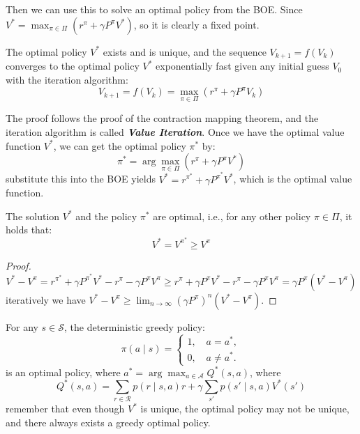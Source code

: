 \documentclass[10pt]{elegantbook}
\newcommand{\mydefination}[1]{\textbf{\textit{\textcolor{structurecolor}{#1}}}}
\begin{document}
Then we can use this to solve an optimal policy from the BOE. Since $V^* = \max_{\pi \in \Pi} (r^{\pi} + \gamma P^{\pi}V^*)$, so it is clearly a 
fixed point.

\begin{theorem}
    The optimal policy $V^*$ exists and is unique, and the sequence $V_{k+1} = f(V_k)$ converges to the optimal policy $V^*$ exponentially fast
    given any initial guess $V_0$ with the iteration algorithm:
    \[ V_{k+1} = f(V_k) = \max_{\pi \in \Pi} (r^{\pi} + \gamma P^{\pi}V_k) \]
\end{theorem}

The proof follows the proof of the contraction mapping theorem, and the iteration algorithm is called \mydefination{Value Iteration}.
Once we have the optimal value function $V^*$, we can get the optimal policy $\pi^*$ by:
\begin{equation}
    \pi^* = \arg\max_{\pi \in \Pi} (r^{\pi} + \gamma P^{\pi}V^*)
\end{equation}
substitute this into the BOE yields $V^* = r^{\pi^*} + \gamma P^{\pi^*}V^*$, which is the optimal value function.

\begin{theorem}
    The solution $V^*$ and the policy $\pi^*$ are optimal, i.e., for any other policy $\pi \in \Pi$, it holds that:
    \[ V^* = V^{\pi^*} \geq V^{\pi} \] 
\end{theorem}

\begin{proof}
    \[ V^* - V^{\pi} = r^{\pi^*} + \gamma P^{\pi^*}V^* - r^{\pi} - \gamma P^{\pi}V^{\pi} \geq 
    r^{\pi} + \gamma P^{\pi}V^* - r^{\pi} - \gamma P^{\pi}V^{\pi} = \gamma P^{\pi} (V^* - V^{\pi}) \]
    iteratively we have $V^* - V^{\pi} \geq \lim_{n \rightarrow \infty} (\gamma P^{\pi})^n (V^* - V^{\pi})$.
\end{proof}

\begin{theorem}
    For any $s \in \mathcal S$, the deterministic greedy policy:
    \begin{equation} \label{eq:greedy_policy}
        \pi(a \mid s) = \left \{ 
        \begin{array}{l}
            1, \quad a = a^*, \\
            0, \quad a \neq a^*.
        \end{array} \right .
    \end{equation}
    is an optimal policy, where $a^* = \arg\max_{a \in \mathcal A} Q^{*}(s, a)$, where
    \[ Q^{*}(s, a) = \sum_{r \in \mathcal R}p(r \mid s, a)r + \gamma \sum_{s'}p(s' \mid s, a)V^{*}(s') \]
    remember that even though $V^*$ is unique, the optimal policy may not be unique, and there always exists a greedy optimal policy.
\end{theorem}
\end{document}
